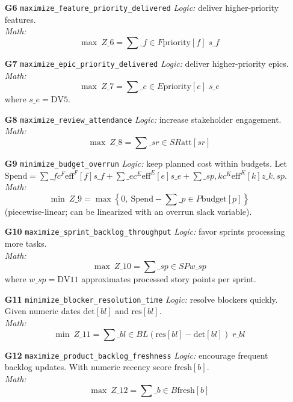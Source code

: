 \documentclass[11pt]{article}
\begin{document}
\begin{itemize}[leftmargin=2em]
  \item[\textbf{G6} \texttt{maximize\_feature\_priority\_delivered}] \emph{Logic:} deliver higher-priority features. \\
  \emph{Math:}
  \[
  \max~ Z\_6=\sum\_{f\in F}\mathrm{priority}[f]\; s\_f
  \]

  \item[\textbf{G7} \texttt{maximize\_epic\_priority\_delivered}] \emph{Logic:} deliver higher-priority epics. \\
  \emph{Math:}
  \[
  \max~ Z\_7=\sum\_{e\in E}\mathrm{priority}[e]\; s\_e
  \]
  where $s\_e=\text{DV5}$.

  \item[\textbf{G8} \texttt{maximize\_review\_attendance}] \emph{Logic:} increase stakeholder engagement. \\
  \emph{Math:}
  \[
  \max~ Z\_8=\sum\_{sr\in SR}\mathrm{att}[sr]
  \]

  \item[\textbf{G9} \texttt{minimize\_budget\_overrun}] \emph{Logic:} keep planned cost within budgets. Let $\mathrm{Spend} = \sum\_f c^{F}\mathrm{eff}^{F}[f]s\_f+\sum\_e c^{E}\mathrm{eff}^{E}[e]s\_e+\sum\_{sp,k} c^{K}\mathrm{eff}^{K}[k]z\_{k,sp}$.\\
  \emph{Math:}
  \[
  \min~ Z\_9=\max\left\{0,\ \mathrm{Spend}-\sum\_{p\in P}\mathrm{budget}[p]\right\}
  \]
  (piecewise-linear; can be linearized with an overrun slack variable).

  \item[\textbf{G10} \texttt{maximize\_sprint\_backlog\_throughput}] \emph{Logic:} favor sprints processing more tasks. \\
  \emph{Math:}
  \[
  \max~ Z\_{10}=\sum\_{sp\in SP} w\_{sp}
  \]
  where $w\_{sp}=\text{DV11}$ approximates processed story points per sprint.

  \item[\textbf{G11} \texttt{minimize\_blocker\_resolution\_time}] \emph{Logic:} resolve blockers quickly. Given numeric dates $\mathrm{det}[bl]$ and $\mathrm{res}[bl]$.\\
  \emph{Math:}
  \[
  \min~ Z\_{11}=\sum\_{bl\in BL} (\mathrm{res}[bl]-\mathrm{det}[bl])\; r\_{bl}
  \]

  \item[\textbf{G12} \texttt{maximize\_product\_backlog\_freshness}] \emph{Logic:} encourage frequent backlog updates. With numeric recency score $\mathrm{fresh}[b]$.\\
  \emph{Math:}
  \[
  \max~ Z\_{12}=\sum\_{b\in B} \mathrm{fresh}[b]
  \]
\end{itemize}
\end{document}
